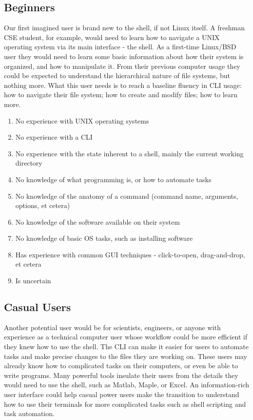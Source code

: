 \subsection{Beginners}
Our first imagined user is brand new to the shell, if not Linux itself. A
freshman CSE student, for example, would need to learn how to navigate a UNIX
operating system via its main interface - the shell. As a first-time Linux/BSD
user they would need to learn some basic information about how their system is
organized, and how to manipulate it. From their previous computer usage they
could be expected to understand the hierarchical nature of file systems, but
nothing more. What this user needs is to reach a baseline fluency in CLI usage:
how to navigate their file system; how to create and modify files; how to learn
more.
\begin{enumerate}
\item No experience with UNIX operating systems
\item No experience with a CLI
\item No experience with the state inherent to a shell, mainly the current working directory
\item No knowledge of what programming is, or how to automate tasks
\item No knowledge of the anatomy of a command (command name, arguments, options, et cetera)
\item No knowledge of the software available on their system
\item No knowledge of basic OS tasks, such as installing software
\item Has experience with common GUI techniques - click-to-open, drag-and-drop, et cetera
\item Is uncertain
\end{enumerate}

\subsection{Casual Users}
Another potential user would be for scientists, engineers, or anyone with
experience as a technical computer user whose workflow could be more efficient
if they knew how to use the shell. The CLI can make it easier for users to
automate tasks and make precise changes to the files they are working on. These
users may already know how to complicated tasks on their computers, or even be
able to write programs. Many powerful tools insulate their users from the
details they would need to use the shell, such as Matlab, Maple, or Excel. An
information-rich user interface could help casual power users make the
transition to understand how to use their terminals for more complicated tasks
such as shell scripting and task automation.

